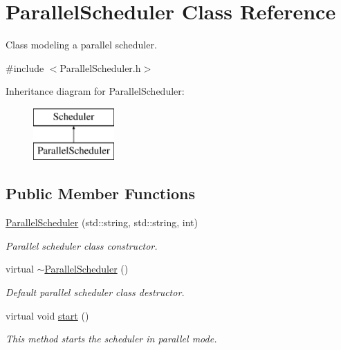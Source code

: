 \hypertarget{classParallelScheduler}{\section{Parallel\-Scheduler Class Reference}
\label{classParallelScheduler}
}


Class modeling a parallel scheduler.  




{\ttfamily \#include $<$Parallel\-Scheduler.\-h$>$}

Inheritance diagram for Parallel\-Scheduler\-:\begin{figure}[H]
\begin{center}
\leavevmode
\includegraphics[height=2.000000cm]{classParallelScheduler}
\end{center}
\end{figure}
\subsection*{Public Member Functions}
\begin{DoxyCompactItemize}
\item 
\hyperlink{classParallelScheduler_a11e91f323808008a8a35961aa84211bf}{Parallel\-Scheduler} (std\-::string, std\-::string, int)
\begin{DoxyCompactList}\small\item\em Parallel scheduler class constructor. \end{DoxyCompactList}\item 
virtual \hyperlink{classParallelScheduler_a995351f4556a464e6c4a78e01cea583c}{$\sim$\-Parallel\-Scheduler} ()
\begin{DoxyCompactList}\small\item\em Default parallel scheduler class destructor. \end{DoxyCompactList}\item 
virtual void \hyperlink{classParallelScheduler_aef0d5f1091857170434687897d19843e}{start} ()
\begin{DoxyCompactList}\small\item\em This method starts the scheduler in parallel mode. \end{DoxyCompactList}\end{DoxyCompactItemize}
